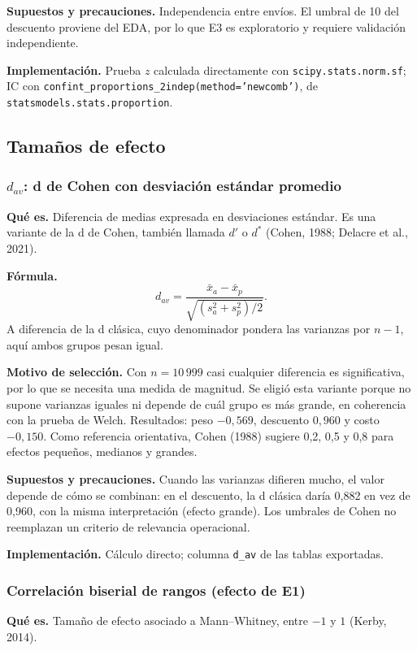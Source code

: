 \documentclass[10pt,a4paper]{article}
\begin{document}
\textbf{Supuestos y precauciones.} Independencia entre envíos. El umbral de 10 del descuento proviene del EDA, por lo que E3 es exploratorio y requiere validación independiente.

{\sloppy \textbf{Implementación.} Prueba $z$ calculada directamente con \texttt{scipy.stats.norm.sf}; IC con \texttt{confint\_proportions\_2indep(method='newcomb')}, de \texttt{statsmodels.stats.proportion}.\par}

\subsection{Tamaños de efecto}

\subsubsection{\texorpdfstring{$d_{av}$}{d\_av}: d de Cohen con desviación estándar promedio}
\textbf{Qué es.} Diferencia de medias expresada en desviaciones estándar. Es una variante de la d de Cohen, también llamada $d'$ o $d^*$ (Cohen, 1988; Delacre et al., 2021).

\textbf{Fórmula.}
\[
d_{av}=\frac{\bar x_a-\bar x_p}{\sqrt{\left(s_a^2+s_p^2\right)/2}}.
\]
A diferencia de la d clásica, cuyo denominador pondera las varianzas por $n-1$, aquí ambos grupos pesan igual.

\textbf{Motivo de selección.} Con $n=10\,999$ casi cualquier diferencia es significativa, por lo que se necesita una medida de magnitud. Se eligió esta variante porque no supone varianzas iguales ni depende de cuál grupo es más grande, en coherencia con la prueba de Welch. Resultados: peso $-0{,}569$, descuento $0{,}960$ y costo $-0{,}150$. Como referencia orientativa, Cohen (1988) sugiere 0,2, 0,5 y 0,8 para efectos pequeños, medianos y grandes.

\textbf{Supuestos y precauciones.} Cuando las varianzas difieren mucho, el valor depende de cómo se combinan: en el descuento, la d clásica daría 0,882 en vez de 0,960, con la misma interpretación (efecto grande). Los umbrales de Cohen no reemplazan un criterio de relevancia operacional.

\textbf{Implementación.} Cálculo directo; columna \texttt{d\_av} de las tablas exportadas.

\subsubsection{Correlación biserial de rangos (efecto de E1)}
\textbf{Qué es.} Tamaño de efecto asociado a Mann--Whitney, entre $-1$ y $1$ (Kerby, 2014).
\end{document}
